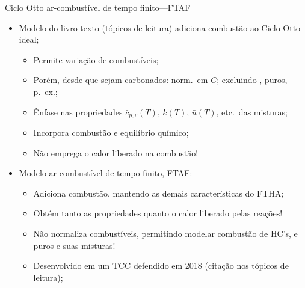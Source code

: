     \begin{frame}{Ciclo Otto ar-combustível de tempo finito---FTAF}\vspace*{-2em}
        \begin{itemize}
            \item<1->  Modelo do livro-texto (tópicos de leitura) adiciona \alert{combustão} ao
                \alert{Ciclo Otto ideal};
            \begin{itemize}
                \item<2->  Permite variação de \alert{combustíveis};
                \item<3->  Porém, desde que sejam \alert{carbonados}: norm.~em $C$; excluindo
                    ,  puros, p.~ex.;
                \item<3->  Ênfase nas \alert{propriedades} $\bar{c}_{p,v}(T)$, $k(T)$,
                    $\bar{u}(T)$, etc.~das misturas;
                \item<4->  Incorpora \alert{combustão} e \alert{equilíbrio químico};
                \item<5->  \alert{Não emprega} o calor liberado na \alert{combustão}!
            \end{itemize}
            \item<6->  Modelo \alert{ar-combustível de tempo finito, FTAF}:
            \begin{itemize}
                \item<7->  Adiciona \alert{combustão}, mantendo as demais características do
                    \alert{FTHA};
                \item<8->  Obtém tanto as \alert{propriedades} quanto o \alert{calor liberado}
                    pelas \alert{reações}!
                \item<9->  \alert{Não normaliza combustíveis}, permitindo modelar combustão de
                    HC's,  e  puros e suas \alert{misturas}!
                \item<10-> Desenvolvido em um \alert{TCC} defendido em \alert{2018} (citação nos
                    tópicos de leitura);
            \end{itemize}
        \end{itemize}
    \end{frame}

